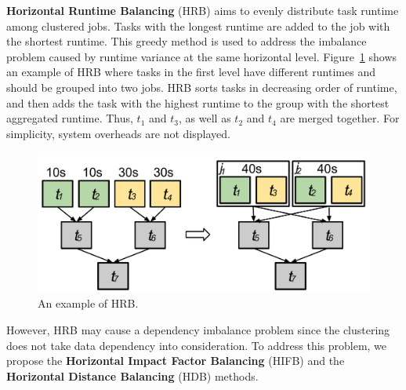 
\textbf{Horizontal Runtime Balancing} (HRB) aims to evenly distribute task runtime among clustered jobs. Tasks with the longest runtime are added to the job with the shortest runtime. This greedy method is used to address the imbalance problem caused by runtime variance at the same horizontal level. Figure~\ref{fig:imbalance_hrb} shows an example of HRB where tasks in the first level have different runtimes and should be grouped into two jobs. HRB sorts tasks in decreasing order of runtime, and then adds the task with the highest runtime to the group with the shortest aggregated runtime. Thus, $t_1$ and $t_3$, as well as $t_2$ and $t_4$ are merged together.
For simplicity, system overheads are not displayed.

\begin{figure}[htb]
	\centering
	\includegraphics[width=0.85\linewidth]{figures/imbalance/hrb.pdf}
	\caption{An example of HRB.}
	\label{fig:imbalance_hrb}
\end{figure}

\noindent However, HRB may cause a dependency imbalance problem since the clustering does not take data dependency into consideration. To address this problem, we propose the \textbf{Horizontal Impact Factor Balancing} (HIFB) and the \textbf{Horizontal Distance Balancing} (HDB) methods. 

